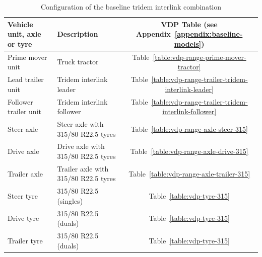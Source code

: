 \begin{table}[H]
	\centering\footnotesize
	\begin{threeparttable}

		\begin{tabulary}{\textwidth}{llc}
			\toprule
    \textbf{Vehicle unit, axle or tyre} & \textbf{Description} & \textbf{VDP Table (see Appendix~\ref{appendix:baseline-models})} \\
    			\midrule
    Prime mover unit & Truck tractor & Table~\ref{table:vdp-range-prime-mover-tractor} \\
    Lead trailer unit & Tridem interlink leader & Table~\ref{table:vdp-range-trailer-tridem-interlink-leader} \\
    Follower trailer unit & Tridem interlink follower & Table~\ref{table:vdp-range-trailer-tridem-interlink-follower} \\
    Steer axle  & Steer axle with 315/80 R22.5 tyres & Table~\ref{table:vdp-range-axle-steer-315} \\
    Drive axle & Drive axle with 315/80 R22.5 tyres & Table~\ref{table:vdp-range-axle-drive-315} \\
    Trailer axle & Trailer axle with 315/80 R22.5 tyres & Table~\ref{table:vdp-range-axle-trailer-315} \\
    Steer tyre & 315/80 R22.5 (singles) & Table~\ref{table:vdp-tyre-315} \\
    Drive tyre  & 315/80 R22.5 (duals) & Table~\ref{table:vdp-tyre-315} \\
    Trailer tyre & 315/80 R22.5 (duals) & Table~\ref{table:vdp-tyre-315} \\
			\bottomrule
		\end{tabulary}

		\caption{Configuration of the baseline tridem interlink combination}
		\label{table:configuration-tridem-interlink}


	\end{threeparttable}
\end{table}


